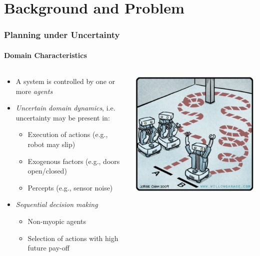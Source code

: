 \section{Background and Problem}

\begin{frame}
	\frametitle{Planning under Uncertainty}
	\framesubtitle{Domain Characteristics}
	
	\begin{columns}[T]
		\begin{column}{.7\textwidth}
			\begin{itemize}
				\item<2-> A system is controlled by one or more \textit{agents}
				\item<3-> \textit{Uncertain domain dynamics}, i.e.\\ uncertainty may be present in:
				\begin{itemize}
					\item Execution of actions (e.g., robot may slip)
					\item Exogenous factors (e.g., doors open/closed)
					\item Percepts (e.g., sensor noise)
				\end{itemize}
				\item<4-> \textit{Sequential decision making}
				\begin{itemize}
					\item Non-myopic agents
					\item Selection of actions with high future pay-off
				\end{itemize}
			\end{itemize}
		\end{column}
		\begin{column}{.35\textwidth}
			\includegraphics[width=1.0\textwidth, right]{figures/path-planning2}
		\end{column}
	\end{columns}
\end{frame}

